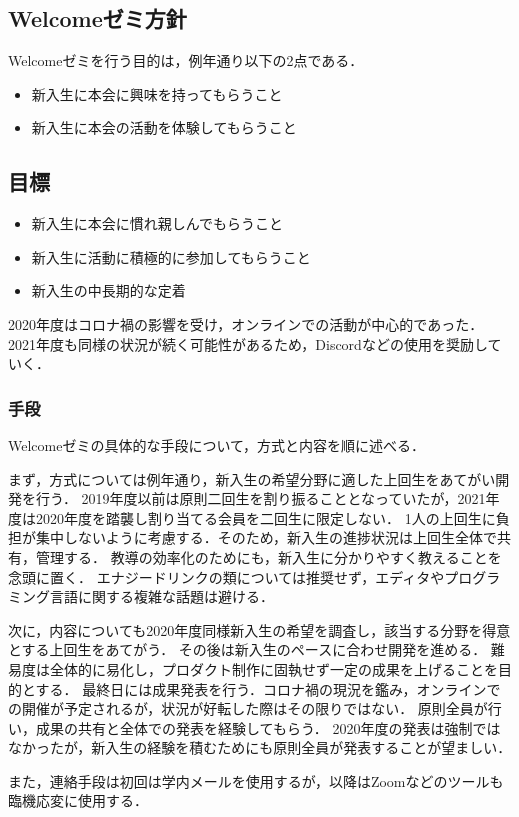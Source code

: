 \subsection*{Welcomeゼミ方針}


Welcomeゼミを行う目的は，例年通り以下の2点である．

\begin{itemize}
    \item 新入生に本会に興味を持ってもらうこと
    \item 新入生に本会の活動を体験してもらうこと
\end{itemize}

\subsection*{目標}
\begin{itemize}
    \item 新入生に本会に慣れ親しんでもらうこと
    \item 新入生に活動に積極的に参加してもらうこと
    \item 新入生の中長期的な定着
\end{itemize}

2020年度はコロナ禍の影響を受け，オンラインでの活動が中心的であった．
2021年度も同様の状況が続く可能性があるため，Discordなどの使用を奨励していく．

\subsubsection*{手段}
Welcomeゼミの具体的な手段について，方式と内容を順に述べる．

まず，方式については例年通り，新入生の希望分野に適した上回生をあてがい開発を行う．
2019年度以前は原則二回生を割り振ることとなっていたが，2021年度は2020年度を踏襲し割り当てる会員を二回生に限定しない．
1人の上回生に負担が集中しないように考慮する．そのため，新入生の進捗状況は上回生全体で共有，管理する．
教導の効率化のためにも，新入生に分かりやすく教えることを念頭に置く．
エナジードリンクの類については推奨せず，エディタやプログラミング言語に関する複雑な話題は避ける．

次に，内容についても2020年度同様新入生の希望を調査し，該当する分野を得意とする上回生をあてがう．
その後は新入生のペースに合わせ開発を進める．
難易度は全体的に易化し，プロダクト制作に固執せず一定の成果を上げることを目的とする．
最終日には成果発表を行う．コロナ禍の現況を鑑み，オンラインでの開催が予定されるが，状況が好転した際はその限りではない．
原則全員が行い，成果の共有と全体での発表を経験してもらう．
2020年度の発表は強制ではなかったが，新入生の経験を積むためにも原則全員が発表することが望ましい．

また，連絡手段は初回は学内メールを使用するが，以降はZoomなどのツールも臨機応変に使用する．
